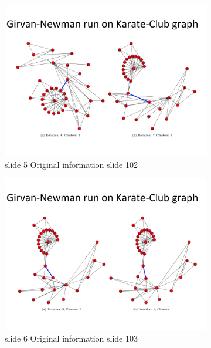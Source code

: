 \documentclass[10pt,letterpaper]{article}
\begin{document}
\begin{figure}[H]
\begin{subfigure}[b]{0.4\linewidth}
     \includegraphics[width=\linewidth]{slide102.png} 
     \caption{slide 5 Original information slide 102}
  \end{subfigure}  
  \begin{subfigure}[b]{0.4\linewidth}
     \includegraphics[width=\linewidth]{slide103.png} 
     \caption{slide 6 Original information slide 103}
  \end{subfigure}   
  \begin{subfigure}[b]{0.4\linewidth}

\end{subfigure}
\end{figure}
\end{document}
